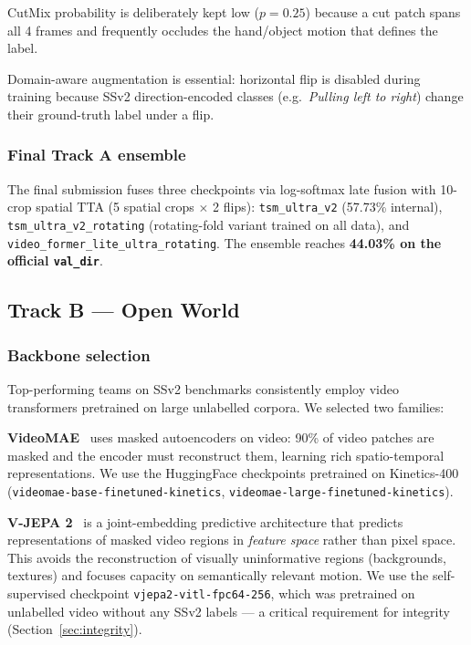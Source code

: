 \documentclass[10pt,twocolumn,letterpaper]{article}
\begin{document}
CutMix probability is deliberately kept low ($p{=}0.25$) because a cut
patch spans all 4 frames and frequently occludes the hand/object motion
that defines the label.

Domain-aware augmentation is essential: horizontal flip is disabled during
training because SSv2 direction-encoded classes (e.g.\ \emph{Pulling left
to right}) change their ground-truth label under a flip.

\subsubsection{Final Track A ensemble}

The final submission fuses three checkpoints via log-softmax late fusion
with 10-crop spatial TTA (5 spatial crops $\times$ 2 flips):
\texttt{tsm\_ultra\_v2} (57.73\% internal),
\texttt{tsm\_ultra\_v2\_rotating} (rotating-fold variant trained on all
data),
and \texttt{video\_former\_lite\_ultra\_rotating}.
The ensemble reaches \textbf{44.03\% on the official \texttt{val\_dir}}.

\subsection{Track B — Open World}
\label{sec:trackB}

\subsubsection{Backbone selection}

Top-performing teams on SSv2 benchmarks consistently employ video
transformers pretrained on large unlabelled corpora.  We selected two
families:

\textbf{VideoMAE}~\cite{tong2022videomae} uses masked autoencoders on
video: 90\% of video patches are masked and the encoder must reconstruct
them, learning rich spatio-temporal representations.  We use the
HuggingFace checkpoints pretrained on Kinetics-400 (\texttt{videomae-base-finetuned-kinetics},
\texttt{videomae-large-finetuned-kinetics}).

\textbf{V-JEPA 2}~\cite{bardes2025vjepa2} is a joint-embedding predictive
architecture that predicts representations of masked video regions in
\emph{feature space} rather than pixel space.  This avoids the
reconstruction of visually uninformative regions (backgrounds, textures)
and focuses capacity on semantically relevant motion.  We use the
self-supervised checkpoint \texttt{vjepa2-vitl-fpc64-256}, which was
pretrained on unlabelled video without any SSv2 labels — a critical
requirement for integrity (Section~\ref{sec:integrity}).
\end{document}
